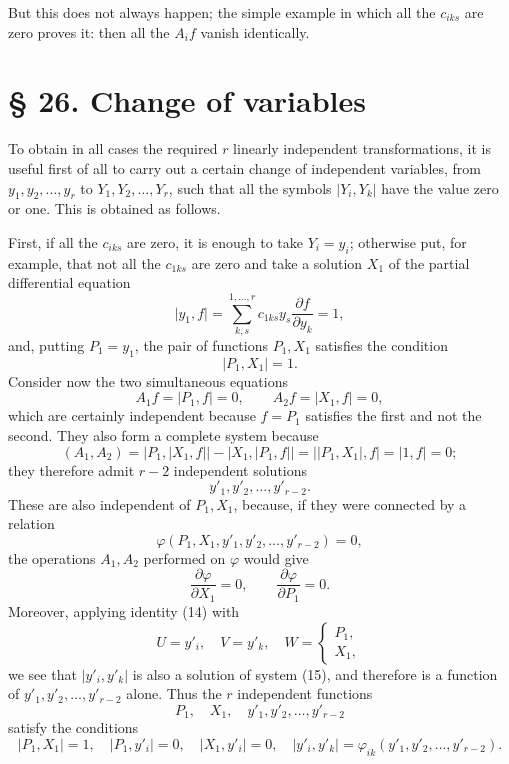 \documentclass[11pt]{book}
\begin{document}
But this does not always happen; the simple example in which all the $c_{iks}$ are zero proves it: then all the $A_if$ vanish identically.

\section*{\S{} 26. Change of variables}

To obtain in all cases the required $r$ linearly independent transformations, it is useful first of all to carry out a certain change of independent variables, from $y_1,y_2,\ldots,y_r$ to $Y_1,Y_2,\ldots,Y_r$, such that all the symbols $\lvert Y_i,Y_k\rvert$ have the value zero or one. This is obtained as follows.

First, if all the $c_{iks}$ are zero, it is enough to take $Y_i=y_i$; otherwise put, for example, that not all the $c_{1ks}$ are zero and take a solution $X_1$ of the partial differential equation
\[
 \lvert y_1,f\rvert=\sum\limits_{k,s}^{1,\ldots,r}c_{1ks}y_s\frac{\partial f}{\partial y_k}=1,
\]
and, putting $P_1=y_1$, the pair of functions $P_1,X_1$ satisfies the condition
\[
 \lvert P_1,X_1\rvert=1.
\]
Consider now the two simultaneous equations
\begin{equation*}\tag{15}
 A_1f=\lvert P_1,f\rvert=0,
 \qquad
 A_2f=\lvert X_1,f\rvert=0,
\end{equation*}
which are certainly independent because $f=P_1$ satisfies the first and not the second. They also form a complete system because
\[
 (A_1,A_2)=\lvert P_1,\lvert X_1,f\rvert\rvert-
 \lvert X_1,\lvert P_1,f\rvert\rvert=
 \lvert\lvert P_1,X_1\rvert,f\rvert=
 \lvert1,f\rvert=0;
\]
they therefore admit $r-2$ independent solutions
\[
 y'_1,y'_2,\ldots,y'_{r-2}.
\]
These are also independent of $P_1,X_1$, because, if they were connected by a relation
\[
 \varphi(P_1,X_1,y'_1,y'_2,\ldots,y'_{r-2})=0,
\]
the operations $A_1,A_2$ performed on $\varphi$ would give
\[
 \frac{\partial\varphi}{\partial X_1}=0,
 \qquad
 \frac{\partial\varphi}{\partial P_1}=0.
\]
Moreover, applying identity (14) with
\[
 U=y'_i,
 \quad V=y'_k,
 \quad W=\begin{cases}P_1,\\ X_1,
 \end{cases}
\]
we see that $\lvert y'_i,y'_k\rvert$ is also a solution of system (15), and therefore is a function of $y'_1,y'_2,\ldots,y'_{r-2}$ alone. Thus the $r$ independent functions
\[
 P_1,
 \quad X_1,
 \quad y'_1,y'_2,\ldots,y'_{r-2}
\]
satisfy the conditions
\[
 \lvert P_1,X_1\rvert=1,
 \quad \lvert P_1,y'_i\rvert=0,
 \quad \lvert X_1,y'_i\rvert=0,
 \quad
 \lvert y'_i,y'_k\rvert=\varphi_{ik}(y'_1,y'_2,\ldots,y'_{r-2}).
\]
\end{document}
